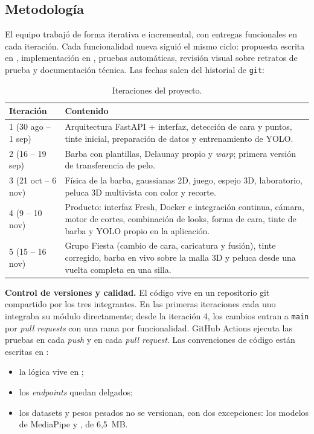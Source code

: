 \subsection{Metodología}

El equipo trabajó de forma iterativa e incremental, con entregas funcionales en cada iteración. Cada funcionalidad nueva siguió el mismo ciclo: propuesta escrita en , implementación en , pruebas automáticas, revisión visual sobre retratos de prueba y documentación técnica. Las fechas salen del historial de \texttt{git}:

\begin{table}[ht]
\centering
\small
\begin{tabularx}{\linewidth}{@{}l X@{}}
\toprule
Iteración & Contenido \\
\midrule
1 (30 ago -- 1 sep) & Arquitectura FastAPI + interfaz, detección de cara y puntos, tinte inicial, preparación de datos y entrenamiento de YOLO. \\
2 (16 -- 19 sep) & Barba con plantillas, Delaunay propio y \emph{warp}; primera versión de transferencia de pelo. \\
3 (21 oct -- 6 nov) & Física de la barba, gaussianas 2D, juego, espejo 3D, laboratorio, peluca 3D multivista con color y recorte. \\
4 (9 -- 10 nov) & Producto: interfaz Fresh, Docker e integración continua, cámara, motor de cortes, combinación de looks, forma de cara, tinte de barba y YOLO propio en la aplicación. \\
5 (15 -- 16 nov) & Grupo Fiesta (cambio de cara, caricatura y fusión), tinte corregido, barba en vivo sobre la malla 3D y peluca desde una vuelta completa en una silla. \\
\bottomrule
\end{tabularx}
\caption{Iteraciones del proyecto.}
\label{tab:iteraciones}
\end{table}

\textbf{Control de versiones y calidad.} El código vive en un repositorio git compartido por los tres integrantes. En las primeras iteraciones cada uno integraba su módulo directamente; desde la iteración 4, los cambios entran a \texttt{main} por \emph{pull requests} con una rama por funcionalidad. GitHub Actions ejecuta las pruebas en cada \emph{push} y en cada \emph{pull request}. Las convenciones de código están escritas en :
\begin{itemize}
  \item la lógica vive en ;
  \item los \emph{endpoints} quedan delgados;
  \item los datasets y pesos pesados no se versionan, con dos excepciones: los modelos de MediaPipe y , de 6{,}5~MB.
\end{itemize}

